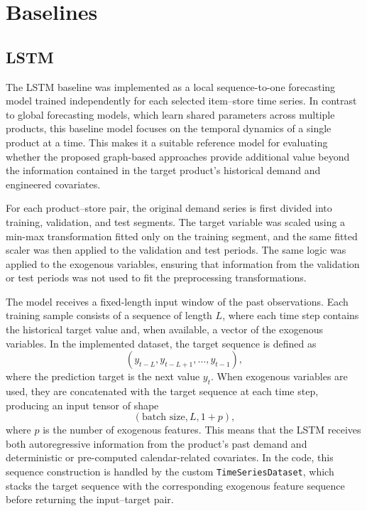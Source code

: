 \chapter{Baselines}

\section{LSTM}


The LSTM baseline was implemented as a local sequence-to-one forecasting model trained independently for each selected item--store time series. In contrast to global forecasting models, which learn shared parameters across multiple products, this baseline model focuses on the temporal dynamics of a single product at a time. This makes it a suitable reference model for evaluating whether the proposed graph-based approaches provide additional value beyond the information contained in the target product’s historical demand and engineered covariates.

For each product--store pair, the original demand series is first divided into training, validation, and test segments. The target variable was scaled using a min-max transformation fitted only on the training segment, and the same fitted scaler was then applied to the validation and test periods. The same logic was applied to the exogenous variables, ensuring that information from the validation or test periods was not used to fit the preprocessing transformations.

The model receives a fixed-length input window of the past observations. Each training sample consists of a sequence of length \(L\), where each time step contains the historical target value and, when available, a vector of the exogenous variables. In the implemented dataset, the target sequence is defined as
\[
(y_{t-L}, y_{t-L+1}, \ldots, y_{t-1}),
\]
where the prediction target is the next value \(y_t\). When exogenous variables are used, they are concatenated with the target sequence at each time step, producing an input tensor of shape
\[
(\text{batch size}, L, 1 + p),
\]
where \(p\) is the number of exogenous features. This means that the LSTM receives both autoregressive information from the product’s past demand and deterministic or pre-computed calendar-related covariates. In the code, this sequence construction is handled by the custom \texttt{TimeSeriesDataset}, which stacks the target sequence with the corresponding exogenous feature sequence before returning the input--target pair.

